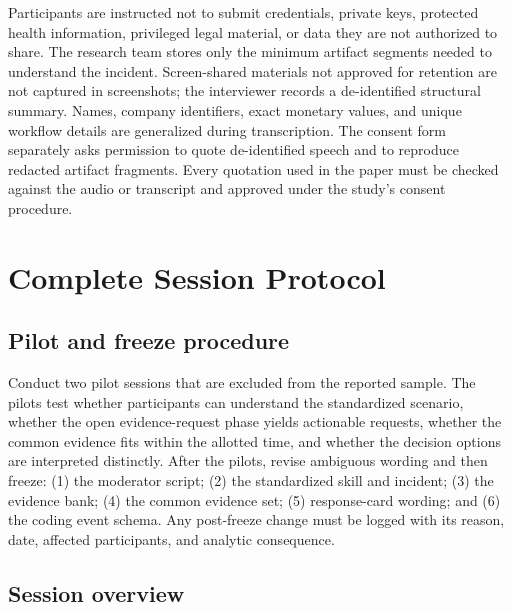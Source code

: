 Participants are instructed not to submit credentials, private keys, protected
health information, privileged legal material, or data they are not authorized
to share. The research team stores only the minimum artifact segments needed to
understand the incident. Screen-shared materials not approved for retention are
not captured in screenshots; the interviewer records a de-identified structural
summary. Names, company identifiers, exact monetary values, and unique workflow
details are generalized during transcription. The consent form separately
asks permission to quote de-identified speech and to reproduce redacted artifact
fragments. Every quotation used in the paper must be checked against the audio
or transcript and approved under the study's consent procedure.

\section{Complete Session Protocol}
\label{app:procedure}

\subsection{Pilot and freeze procedure}

Conduct two pilot sessions that are excluded from the reported sample. The
pilots test whether participants can understand the standardized scenario,
whether the open evidence-request phase yields actionable requests, whether the
common evidence fits within the allotted time, and whether the decision options
are interpreted distinctly. After the pilots, revise ambiguous wording and
then freeze: (1) the moderator script; (2) the standardized skill and incident;
(3) the evidence bank; (4) the common evidence set; (5) response-card wording;
and (6) the coding event schema. Any post-freeze change must be logged with its
reason, date, affected participants, and analytic consequence.

\subsection{Session overview}

